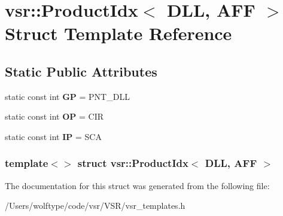 \hypertarget{structvsr_1_1_product_idx_3_01_d_l_l_00_01_a_f_f_01_4}{\section{vsr\-:\-:Product\-Idx$<$ D\-L\-L, A\-F\-F $>$ Struct Template Reference}
\label{structvsr_1_1_product_idx_3_01_d_l_l_00_01_a_f_f_01_4}
}
\subsection*{Static Public Attributes}
\begin{DoxyCompactItemize}
\item 
\hypertarget{structvsr_1_1_product_idx_3_01_d_l_l_00_01_a_f_f_01_4_a46db1463f59608a7041bfc31c2c34982}{static const int {\bfseries G\-P} = P\-N\-T\-\_\-\-D\-L\-L}\label{structvsr_1_1_product_idx_3_01_d_l_l_00_01_a_f_f_01_4_a46db1463f59608a7041bfc31c2c34982}

\item 
\hypertarget{structvsr_1_1_product_idx_3_01_d_l_l_00_01_a_f_f_01_4_a1bcb86ca5739e6b342b5f21fa4525aa8}{static const int {\bfseries O\-P} = C\-I\-R}\label{structvsr_1_1_product_idx_3_01_d_l_l_00_01_a_f_f_01_4_a1bcb86ca5739e6b342b5f21fa4525aa8}

\item 
\hypertarget{structvsr_1_1_product_idx_3_01_d_l_l_00_01_a_f_f_01_4_af501d797df8b53936ceba4b6844d8695}{static const int {\bfseries I\-P} = S\-C\-A}\label{structvsr_1_1_product_idx_3_01_d_l_l_00_01_a_f_f_01_4_af501d797df8b53936ceba4b6844d8695}

\end{DoxyCompactItemize}
\subsubsection*{template$<$$>$ struct vsr\-::\-Product\-Idx$<$ D\-L\-L, A\-F\-F $>$}



The documentation for this struct was generated from the following file\-:\begin{DoxyCompactItemize}
\item 
/\-Users/wolftype/code/vsr/\-V\-S\-R/vsr\-\_\-templates.\-h\end{DoxyCompactItemize}
